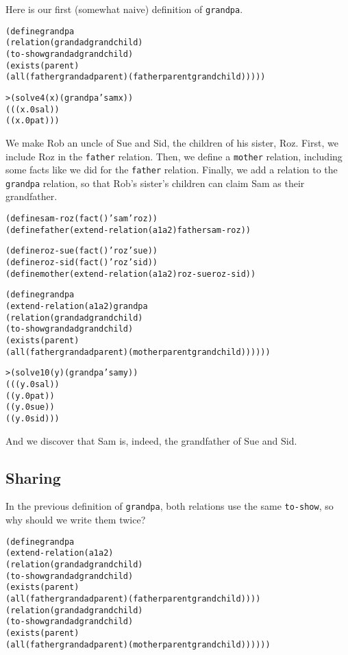 Here is our first (somewhat naive) definition of \texttt{grandpa}.

\begin{alltt}
(define grandpa
  (relation (grandad grandchild)
    (to-show grandad grandchild)
    (exists (parent)
      (all (father grandad parent) (father parent grandchild)))))

> (solve 4 (x) (grandpa 'sam x))
(((x.0 sal))
 ((x.0 pat)))
\end{alltt}

We make Rob an uncle of Sue and Sid, the children of his sister,
Roz.  First, we include Roz in the \texttt{father} relation.
Then, we define a \texttt{mother} relation, including some facts like
we did for the \texttt{father} relation.  Finally, we add a relation
to the \texttt{grandpa} relation, so that Rob's sister's children can
claim Sam as their grandfather.

\begin{alltt}
(define sam-roz (fact () 'sam 'roz))
(define father (extend-relation (a1 a2) father sam-roz))
\end{alltt}

\begin{alltt}
(define roz-sue (fact () 'roz 'sue))
(define roz-sid (fact () 'roz 'sid))
(define mother (extend-relation (a1 a2) roz-sue roz-sid))
\end{alltt}

\begin{alltt}
(define grandpa
  (extend-relation (a1 a2) grandpa
    (relation (grandad grandchild)
      (to-show grandad grandchild)
      (exists (parent)
        (all (father grandad parent) (mother parent grandchild))))))
\end{alltt}

\begin{alltt}
> (solve 10 (y) (grandpa 'sam y))
(((y.0 sal))
 ((y.0 pat))
 ((y.0 sue))
 ((y.0 sid)))
\end{alltt}

\noindent
And we discover that Sam is, indeed, the grandfather of
Sue and Sid.

\subsection{Sharing}
In the previous definition of \texttt{grandpa}, both relations use the
same \texttt{to-show}, so why should we write them twice?
\begin{alltt}
(define grandpa
  (extend-relation (a1 a2)
    (relation (grandad grandchild)
      (to-show grandad grandchild)
      (exists (parent)
        (all (father grandad parent) (father parent grandchild))))
    (relation (grandad grandchild)
      (to-show grandad grandchild)
      (exists (parent)
        (all (father grandad parent) (mother parent grandchild))))))
\end{alltt}

